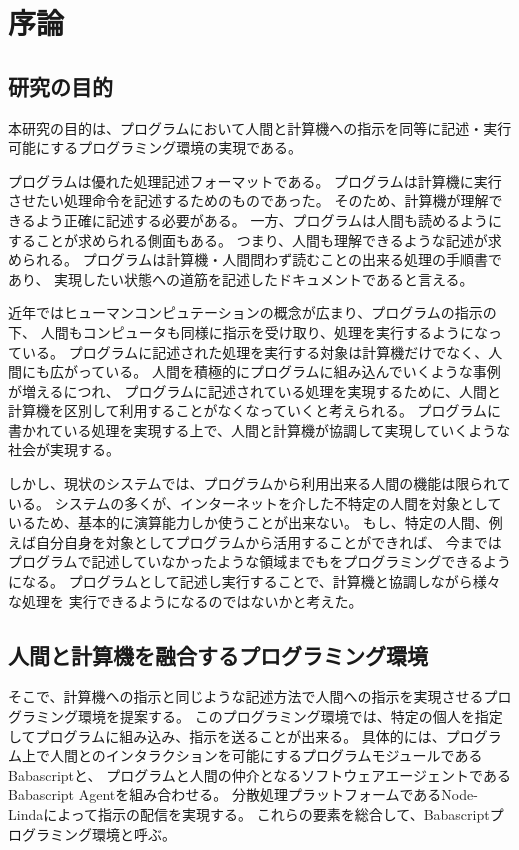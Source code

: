 \chapter{序論}\label{chap:introduction}

\section{研究の目的}\label{ux7814ux7a76ux306eux76eeux7684}

本研究の目的は、プログラムにおいて人間と計算機への指示を同等に記述・実行可能にするプログラミング環境の実現である。

プログラムは優れた処理記述フォーマットである。
プログラムは計算機に実行させたい処理命令を記述するためのものであった。
そのため、計算機が理解できるよう正確に記述する必要がある。
一方、プログラムは人間も読めるようにすることが求められる側面もある。
つまり、人間も理解できるような記述が求められる。
プログラムは計算機・人間問わず読むことの出来る処理の手順書であり、
実現したい状態への道筋を記述したドキュメントであると言える。

近年ではヒューマンコンピュテーションの概念が広まり、プログラムの指示の下、
人間もコンピュータも同様に指示を受け取り、処理を実行するようになっている。
プログラムに記述された処理を実行する対象は計算機だけでなく、人間にも広がっている。
人間を積極的にプログラムに組み込んでいくような事例が増えるにつれ、
プログラムに記述されている処理を実現するために、人間と計算機を区別して利用することがなくなっていくと考えられる。
プログラムに書かれている処理を実現する上で、人間と計算機が協調して実現していくような
社会が実現する。

しかし、現状のシステムでは、プログラムから利用出来る人間の機能は限られている。
システムの多くが、インターネットを介した不特定の人間を対象としているため、基本的に演算能力しか使うことが出来ない。
もし、特定の人間、例えば自分自身を対象としてプログラムから活用することができれば、
今まではプログラムで記述していなかったような領域までもをプログラミングできるようになる。
プログラムとして記述し実行することで、計算機と協調しながら様々な処理を
実行できるようになるのではないかと考えた。

\section{人間と計算機を融合するプログラミング環境}\label{ux4ebaux9593ux3068ux8a08ux7b97ux6a5fux3092ux878dux5408ux3059ux308bux30d7ux30edux30b0ux30e9ux30dfux30f3ux30b0ux74b0ux5883}

そこで、計算機への指示と同じような記述方法で人間への指示を実現させるプログラミング環境を提案する。
このプログラミング環境では、特定の個人を指定してプログラムに組み込み、指示を送ることが出来る。
具体的には、プログラム上で人間とのインタラクションを可能にするプログラムモジュールであるBabascriptと、
プログラムと人間の仲介となるソフトウェアエージェントであるBabascript
Agentを組み合わせる。
分散処理プラットフォームであるNode-Lindaによって指示の配信を実現する。
これらの要素を総合して、Babascriptプログラミング環境と呼ぶ。

